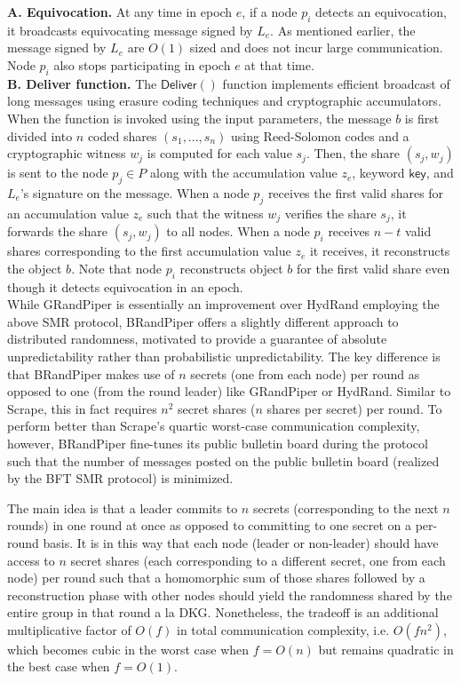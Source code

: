 \documentclass[11pt]{article}
\theoremstyle{definition}
\theoremstyle{remark}
\begin{document}
\textbf{A. Equivocation.} At any time in epoch $e$, if a node $p_i$ detects an equivocation, it broadcasts equivocating message signed by $L_e$. As mentioned earlier, the message signed by $L_e$ are $O(1)$ sized and does not incur large communication. Node $p_i$ also stops participating in epoch $e$ at that time.\\

\textbf{B. Deliver function.} The $\mathsf{Deliver}()$ function implements efficient broadcast of long messages using erasure coding techniques and cryptographic accumulators. When the function is invoked using the input parameters, the message $b$ is first divided into $n$ coded shares $(s_1, ..., s_n)$ using Reed-Solomon codes and a cryptographic witness $w_j$ is computed for each value $s_j$. Then, the share $(s_j, w_j)$ is sent to the node $p_j \in P$ along with the accumulation value $z_e$, keyword $\mathsf{key}$, and $L_e$'s signature on the message. When a node $p_j$ receives the first valid shares for an accumulation value $z_e$ such that the witness $w_j$ verifies the share $s_j$, it forwards the share $(s_j, w_j)$ to all nodes. When a node $p_i$ receives $n - t$ valid shares corresponding to the first accumulation value $z_e$ it receives, it reconstructs the object $b$. Note that node $p_i$ reconstructs object $b$ for the first valid share even though it detects equivocation in an epoch.\\

While GRandPiper is essentially an improvement over HydRand employing the above SMR protocol, BRandPiper offers a slightly different approach to distributed randomness, motivated to provide a guarantee of absolute unpredictability rather than probabilistic unpredictability. The key difference is that BRandPiper makes use of $n$ secrets (one from each node) per round as opposed to one (from the round leader) like GRandPiper or HydRand. Similar to Scrape, this in fact requires $n^2$ secret shares ($n$ shares per secret) per round. To perform better than Scrape's quartic worst-case communication complexity, however, BRandPiper fine-tunes its public bulletin board during the protocol such that the number of messages posted on the public bulletin board (realized by the BFT SMR protocol) is minimized.

The main idea is that a leader commits to $n$ secrets (corresponding to the next $n$ rounds) in one round at once as opposed to committing to one secret on a per-round basis. It is in this way that each node (leader or non-leader) should have access to $n$ secret shares (each corresponding to a different secret, one from each node) per round such that a homomorphic sum of those shares followed by a reconstruction phase with other nodes should yield the randomness shared by the entire group in that round a la DKG. Nonetheless, the tradeoff is an additional multiplicative factor of $O(f)$ in total communication complexity, i.e. $O(f n^2)$, which becomes cubic in the worst case when $f = O(n)$ but remains quadratic in the best case when $f = O(1)$.
\end{document}
